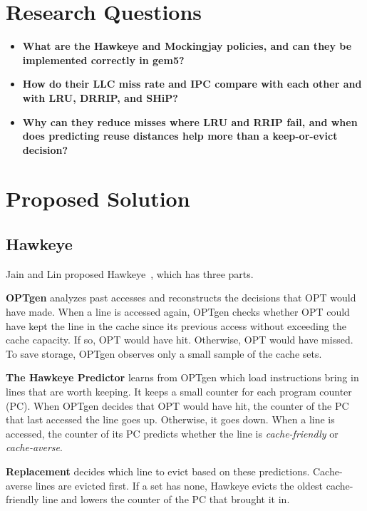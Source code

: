 \documentclass[lettersize,journal]{IEEEtran}
\begin{document}
\section{Research Questions}

\begin{itemize}
\item \textbf{What are the Hawkeye and Mockingjay policies, and can they be
implemented correctly in gem5?}
\item \textbf{How do their LLC miss rate and IPC compare with each other and
with LRU, DRRIP, and SHiP?}
\item \textbf{Why can they reduce misses where LRU and RRIP fail, and when does
predicting reuse distances help more than a keep-or-evict decision?}
\end{itemize}

\section{Proposed Solution}

\subsection{Hawkeye}

Jain and Lin proposed Hawkeye~\cite{hawkeye}, which has three parts.

\textbf{OPTgen} analyzes past accesses and reconstructs the decisions that OPT
would have made. When a line is accessed again, OPTgen checks whether OPT could
have kept the line in the cache since its previous access without exceeding the
cache capacity. If so, OPT would have hit. Otherwise, OPT would have missed. To
save storage, OPTgen observes only a small sample of the cache sets.

\textbf{The Hawkeye Predictor} learns from OPTgen which load instructions bring
in lines that are worth keeping. It keeps a small counter for each program
counter (PC). When OPTgen decides that OPT would have hit, the counter of the
PC that last accessed the line goes up. Otherwise, it goes down. When a line is
accessed, the counter of its PC predicts whether the line is
\emph{cache-friendly} or \emph{cache-averse}.

\textbf{Replacement} decides which line to evict based on these predictions.
Cache-averse lines are evicted first. If a set has none, Hawkeye evicts the
oldest cache-friendly line and lowers the counter of the PC that brought it
in.
\end{document}
